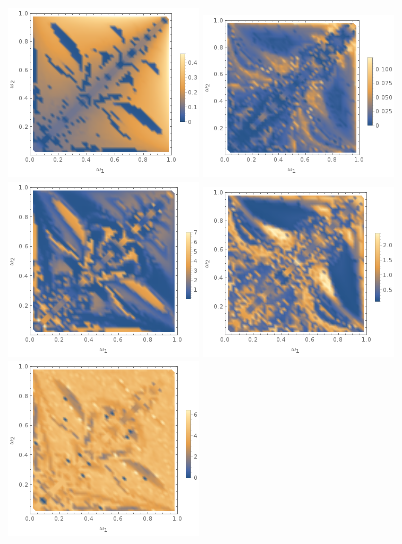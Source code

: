 \documentclass[11pt]{book}
\begin{document}
\begin{figure}[p]
  \centering
  \includegraphics[width=0.45\textwidth]{plot/energy-ratio-sine-2d.png}
  \includegraphics[width=0.45\textwidth]{plot/energy-ratio-sine-3d.png} \\
  \includegraphics[width=0.45\textwidth]{plot/r_max-sine-2d.png}
  \includegraphics[width=0.45\textwidth]{plot/r_max-sine-3d.png} \\
  \includegraphics[width=0.45\textwidth]{plot/slow-mode-logscale-sine-2d.png}

\end{figure}
\end{document}
